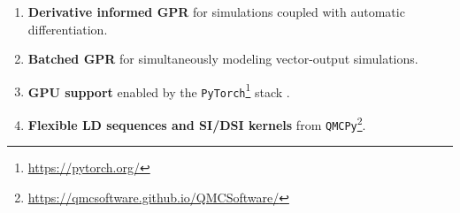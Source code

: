 \begin{talk}
\begin{enumerate}
          \item \textbf{Derivative informed GPR} for simulations coupled with automatic differentiation. 
          \item \textbf{Batched GPR} for simultaneously modeling vector-output simulations.
          \item \textbf{GPU support} enabled by the \texttt{PyTorch}\footnote{\url{https://pytorch.org/}} stack . 
          \item \textbf{Flexible LD sequences and SI/DSI kernels} from \texttt{QMCPy}\footnote{\url{https://qmcsoftware.github.io/QMCSoftware/}}.
        \end{enumerate}








\end{talk}

